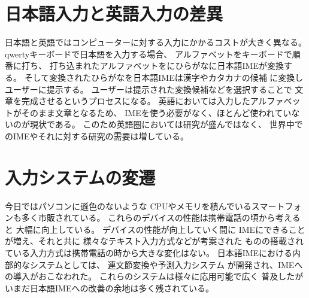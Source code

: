 \section{日本語入力と英語入力の差異}
日本語と英語ではコンピューターに対する入力にかかるコストが大きく異なる。
qwertyキーボードで日本語を入力する場合、
アルファベットをキーボードで順番に打ち、
打ち込まれたアルファベットをにひらがなに日本語IMEが変換する。
そして変換されたひらがなを日本語IMEは漢字やカタカナの候補
に変換しユーザーに提示する。
ユーザーは提示された変換候補などを選択することで
文章を完成させるというプロセスになる。
英語においては入力したアルファベットがそのまま文章となるため、
IMEを使う必要がなく、ほとんど使われていないのが現状である。
このため英語圏においては研究が盛んではなく、
世界中でのIMEやそれに対する研究の需要は増している。

\section{入力システムの変遷}
今日ではパソコンに遜色のないような
CPUやメモリを積んでいるスマートフォンも多く市販されている。
これらのデバイスの性能は携帯電話の頃から考えると
大幅に向上している。
デバイスの性能が向上していく間に
IMEにできることが増え、それと共に
様々なテキスト入力方式などが考案された\cite{増井俊之:2002-08-01}
ものの搭載されている入力方式は携帯電話の時から大きな変化はない。
日本語IMEにおける内部的なシステムとしては、
連文節変換や予測入力システム\cite{pobox}
が開発され、IMEへの導入がおこなわれた。
これらのシステムは様々に応用可能で広く
普及したがいまだ日本語IMEへの改善の余地は多く残されている。
